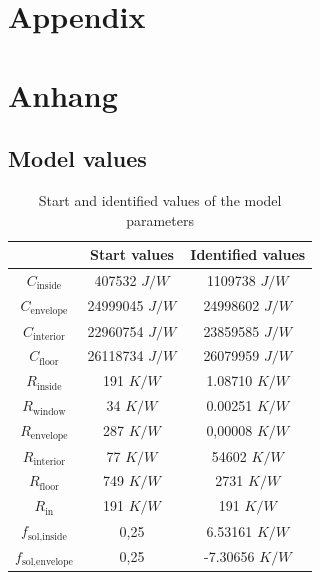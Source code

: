 

{\chapter{Appendix}}    %
{\chapter{Anhang}}      %
\label{chap:appendix}

\section{Model values}
\label{sec:appendix:Modelvalues}
\begin{table}[h]
    \centering
    \begin{tabular}{c|c|c}
         &  Start values & Identified values\\
         \hline
        $C_\text{inside}$& 407532 $J/W$ & 1109738 $J/W$\\
        $C_\text{envelope}$ & 24999045 $J/W$ & 24998602 $J/W$\\
        $C_\text{interior}$& 22960754 $J/W$ & 23859585 $J/W$\\
        $C_\text{floor}$ & 26118734 $J/W$ & 26079959 $J/W$\\
        $R_\text{inside}$ & 191 $K/W$ & 1.08710 $K/W$\\
        $R_\text{window}$ & 34 $K/W$ & 0.00251 $K/W$\\
        $R_\text{envelope}$ & 287 $K/W$ & 0,00008 $K/W$\\
        $R_\text{interior}$& 77 $K/W$ & 54602 $K/W$\\
        $R_\text{floor}$ & 749 $K/W$ & 2731 $K/W$\\
        $R_\text{in}$ & 191 $K/W$ & 191 $K/W$\\
        $f_\text{sol,inside}$ & 0,25 & 6.53161 $K/W$\\
        $f_\text{sol,envelope}$ &0,25 & -7.30656 $K/W$\\
    \end{tabular}
    \caption{Start and identified values of the model parameters}
    \label{tab:StartwerteSchätzung}
\end{table}

